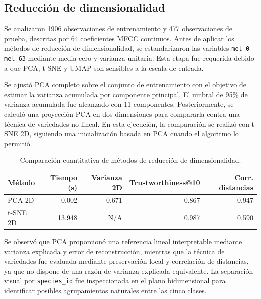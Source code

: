 \subsection{Reducci\'on de dimensionalidad}
Se analizaron 1906 observaciones de entrenamiento y 477 observaciones de prueba, descritas por 64 coeficientes MFCC continuos. Antes de aplicar los m\'etodos de reducci\'on de dimensionalidad, se estandarizaron las variables \texttt{mel\_0}--\texttt{mel\_63} mediante media cero y varianza unitaria. Esta etapa fue requerida debido a que PCA, t-SNE y UMAP son sensibles a la escala de entrada.

Se ajust\'o PCA completo sobre el conjunto de entrenamiento con el objetivo de estimar la varianza acumulada por componente principal. El umbral de 95\% de varianza acumulada fue alcanzado con 11 componentes. Posteriormente, se calcul\'o una proyecci\'on PCA en dos dimensiones para compararla contra una t\'ecnica de variedades no lineal. En esta ejecuci\'on, la comparaci\'on se realiz\'o con t-SNE 2D, siguiendo una inicializaci\'on basada en PCA cuando el algoritmo lo permiti\'o.

\begin{table}[H]
\centering
\caption{Comparaci\'on cuantitativa de m\'etodos de reducci\'on de dimensionalidad.}
\begin{tabular}{lrrrr}
\hline
M\'etodo & Tiempo (s) & Varianza 2D & Trustworthiness@10 & Corr. distancias \\
\hline
PCA 2D & 0.002 & 0.671 & 0.867 & 0.947 \\
t-SNE 2D & 13.948 & N/A & 0.987 & 0.590 \\
\hline
\end{tabular}
\end{table}

Se observ\'o que PCA proporcion\'o una referencia lineal interpretable mediante varianza explicada y error de reconstrucci\'on, mientras que la t\'ecnica de variedades fue evaluada mediante preservaci\'on local y correlaci\'on de distancias, ya que no dispone de una raz\'on de varianza explicada equivalente. La separaci\'on visual por \texttt{species\_id} fue inspeccionada en el plano bidimensional para identificar posibles agrupamientos naturales entre las cinco clases.
